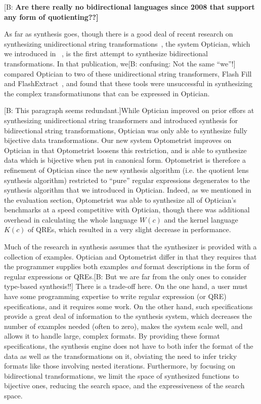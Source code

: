 \documentclass[acmsmall,review,anonymous]{acmart}
\newcommand{\FINISH}[3]{\ifdraft\textcolor{#1}{[#2: #3]}\fi}
\newcommand{\bcp}[1]{\FINISH{dkred}{B}{#1}}
\newcommand{\BCP}[1]{\FINISH{dkred}{B}{\bf #1}}
\newcommand{\Name}{Optometrist\xspace}
\begin{document}
\BCP{Are there really no bidirectional languages since 2008 that support any
form of quotienting??}

As far as synthesis goes, though there is a good deal of recent research on
synthesizing unidirectional string
transformations~\cite{singh2012learning,le-pldi-2014,gulwani-popl-2014,perelman2014test,Singh:blinkfill},
the system Optician, which we introduced in ~\cite{optician}, is the first attempt
to synthesize bidirectional transformations. In that
publication, we\bcp{confusing: Not the same ``we''!} compared Optician to
two of these unidirectional string 
transformers, Flash Fill~\cite{gulwani-popl-2014} and
FlashExtract~\cite{le-pldi-2014}, and found that these tools were unsuccessful
in synthesizing the complex transformatiunons that can be expressed in Optician.

\bcp{This paragraph seems redundant.}While Optician improved on prior effors
at synthesizing unidirectional string 
transformers and introduced synthesis for bidirectional string transformations,
Optician was only able to synthesize fully bijective data transformations. Our
new system \Name{} improves on Optician in that \Name{} loosens this
restriction, and is able to synthesize data which is bijective when put in
canonical form. \Name{} is therefore a refinement of Optician since the
new synthesis algorithm (i.e. the quotient lens synthesis algorithm) restricted
to ``pure'' regular expressions degenerates to the synthesis algorithm that
we introduced in Optician. Indeed, as we mentioned in the evaluation section,
\Name{} was able to synthesize all of Optician's benchmarks at a speed
competitive with Optician, though there was additional overhead in calculating
the whole language $W(c)$ and the kernel language $K(c)$ of QREs, which
resulted in a very slight decrease in performance.

Much of the research in synthesis assumes that the synthesizer is provided with
a collection of examples. Optician and Optometrist differ in that they requires
that the programmer supplies both examples {\em and} format descriptions in the
form of regular expressions or QREs.\bcp{But we are far from the only ones
  to consider type-based synthesis!!}  There is a trade-off here.  On the one
hand, a user must have some programming expertise to write regular expression
(or QRE) specifications, and it requires some work. On the other hand, such
specifications provide a great deal of information to the synthesis system,
which decreases the number of examples needed (often to zero), makes the system
scale well, and allows it to handle large, complex formats.  By providing these
format specifications, the synthesis engine does not have to both infer the
format of the data as well as the transformations on it, obviating the need to
infer tricky formats like those involving nested iterations. Furthermore, by
focusing on bidirectional transformations, we limit the space of synthesized
functions to bijective ones, reducing the search space, and the expressiveness
of the search space.
\end{document}

